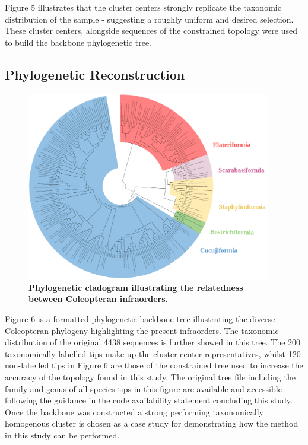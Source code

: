 \documentclass[12pt]{article}
\begin{document}
  Figure 5 illustrates that the cluster centers strongly replicate the taxonomic distribution of the sample - suggesting a roughly uniform and desired selection. These cluster centers, alongside sequences of the constrained topology were used to build the backbone phylogenetic tree. 

  \subsection{Phylogenetic Reconstruction}

  \begin{figure}[H]
      \centering
      \includegraphics[width=0.95\textwidth]{bbb.png}
      \captionsetup{margin=0.75cm}
      \caption{\textbf{\small Phylogenetic cladogram illustrating the relatedness between Coleopteran infraorders.}}
  \end{figure}

  Figure 6 is a formatted phylogenetic backbone tree illustrating the diverse Coleopteran phylogeny highlighting the present infraorders. The taxonomic distribution of the original 4438 sequences is further showed in this tree. The 200 taxonomically labelled tips make up the cluster center representatives, whilst 120 non-labelled tips in Figure 6 are those of the constrained tree used to increase the accuracy of the topology found in this study. The original tree file including the family and genus of all species tips in this figure are available and accessible following the guidance in the code availability statement concluding this study. Once the backbone was constructed a strong performing taxonomically homogenous cluster is chosen as a case study for demonstrating how the method in this study can be performed.
\end{document}
